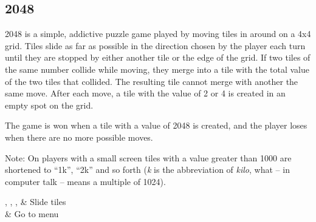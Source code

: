\subsection{2048}

2048 is a simple, addictive puzzle game played by moving tiles in around on a 4x4 grid. Tiles slide as far as possible in the direction chosen by the player each turn until they are stopped by either another tile or the edge of the grid. If two tiles of the same number collide while moving, they merge into a tile with the total value of the two tiles that collided. The resulting tile cannot merge with another the same move. After each move, a tile with the value of 2 or 4 is created in an empty spot on the grid.

The game is won when a tile with a value of 2048 is created, and the player loses when there are no more possible moves.

Note: On players with a small screen tiles with a value greater than 1000 are shortened
to ``1k'', ``2k'' and so forth (\emph{k} is the abbreviation of \emph{kilo},
what -- in computer talk -- means a multiple of 1024).

\begin{btnmap}
  \PluginUp, \PluginDown, \PluginLeft, \PluginRight
  & Slide tiles\\

  \PluginCancel
  & Go to menu\\
\end{btnmap}
